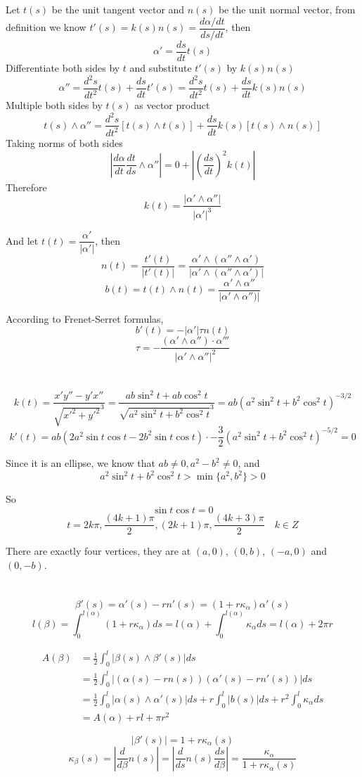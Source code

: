\documentclass{article}
\begin{document}
\section{}
Let $t(s)$ be the unit tangent vector and $n(s)$ be the unit normal vector, from definition we know $t'(s)=k(s)n(s)=\dfrac{d\alpha/dt}{ds/dt}$, then
$$\alpha'=\frac{ds}{dt}t(s)$$
Differentiate both sides by $t$ and substitute $t'(s)$ by $k(s)n(s)$
$$\alpha''=\frac{d^2s}{dt^2}t(s)+\frac{ds}{dt}t'(s)=\frac{d^2s}{dt^2}t(s)+\frac{ds}{dt}k(s)n(s)$$
Multiple both sides by $t(s)$ as vector product
$$t(s)\land\alpha''=\frac{d^2s}{dt^2}[t(s)\land t(s)]+\frac{ds}{dt}k(s)[t(s)\land n(s)]$$
Taking norms of both sides
$$\left|\frac{d\alpha}{dt}\frac{dt}{ds}\land\alpha''\right|=0+\left|\left(\frac{ds}{dt}\right)^2k(t)\right|$$
Therefore
$$k(t)=\frac{|\alpha'\land\alpha''|}{|\alpha'|^3}$$

And let $t(t)=\dfrac{\alpha'}{|\alpha'|}$, then
$$n(t)=\frac{t'(t)}{|t'(t)|}=\frac{\alpha'\land(\alpha''\land\alpha')}{|\alpha'\land(\alpha''\land\alpha')|}$$
$$b(t)=t(t)\land n(t)=\frac{\alpha'\land \alpha''}{|\alpha'\land\alpha'')|}$$

According to Frenet-Serret formulas,
$$b'(t)=-|\alpha'|\tau n(t)$$
$$\tau=-\frac{(\alpha'\land \alpha'')\cdot \alpha'''}{|\alpha'\land\alpha''|^2}$$

\section{}
$$k(t)=\frac{x'y''-y'x''}{\sqrt{x'^2+y'^2}^3}=\frac{ab\sin^2t+ab\cos^2t}{\sqrt{a^2\sin^2t+b^2\cos^2t}^3}=ab(a^2\sin^2t+b^2\cos^2t)^{-3/2}$$
$$k'(t)=ab(2a^2\sin t\cos t-2b^2\sin t\cos t)\cdot-\frac{3}{2}(a^2\sin^2t+b^2\cos^2t)^{-5/2}=0$$

Since it is an ellipse, we know that $ab\neq0,a^2-b^2\neq0$, and
$$a^2\sin^2t+b^2\cos^2t>\min\{a^2,b^2\}>0$$

So $$\sin t\cos t=0$$
$$t=2k\pi,\frac{(4k+1)\pi}{2},(2k+1)\pi,\frac{(4k+3)\pi}{2}\quad k\in Z$$

There are exactly four vertices, they are at $(a,0)$, $(0,b)$, $(-a,0)$ and $(0,-b)$.

\section{}
$$\beta'(s)=\alpha'(s)-rn'(s)=(1+r\kappa_\alpha)\alpha'(s)$$
$$l(\beta)=\int_0^{l(\alpha)}(1+r\kappa_\alpha)ds=l(\alpha)+\int_0^{l(\alpha)}\kappa_\alpha ds=l(\alpha)+2\pi r$$

\begin{align*}
A(\beta)&=\frac{1}{2}\int_0^l|\beta(s)\land \beta'(s)|ds\\
&=\frac{1}{2}\int_0^l|(\alpha(s)-rn(s))(\alpha'(s)-rn'(s))|ds\\
&=\frac{1}{2}\int_0^l|\alpha(s)\land \alpha'(s)|ds+r\int_0^l|b(s)|ds+r^2\int_0^l\kappa_\alpha ds\\
&=A(\alpha)+rl+\pi r^2
\end{align*}

$$|\beta'(s)|=1+r\kappa_\alpha(s)$$
$$\kappa_\beta(s)=\left|\frac{d}{d\beta}n(s)\right|=\left|\frac{d}{ds}n(s)\frac{ds}{d\beta}\right|=\frac{\kappa_\alpha}{1+r\kappa_\alpha(s)}$$
\end{document}
